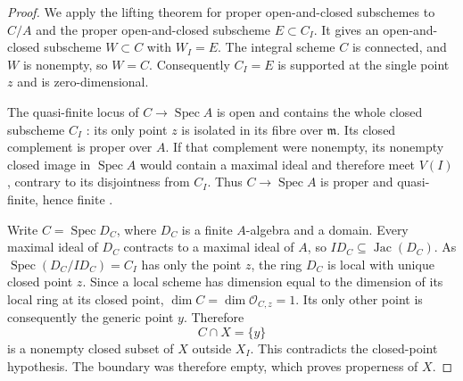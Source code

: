 \begin{proof}
We apply the lifting theorem for proper open-and-closed subschemes
\cite[Lemma~37.53.9, Tag~0CT9]{BStacks} to $C/A$ and the proper
open-and-closed subscheme $E\subset C_I$. It gives an
open-and-closed subscheme $W\subset C$ with $W_I=E$.
The integral scheme $C$ is connected, and $W$ is nonempty,
so $W=C$. Consequently $C_I=E$ is supported at the single
point $z$ and is zero-dimensional.

The quasi-finite locus of $C\to\operatorname{Spec}A$ is open
\cite[Lemma~29.57.2, Tag~01TI]{BStacks} and contains the whole closed
subscheme $C_I$ \cite[Lemma~29.30.5, Tag~0397]{BStacks}: its only
point $z$ is isolated in its fibre over $\mathfrak m$.
Its closed complement is proper over $A$. If that complement
were nonempty, its nonempty closed image in
$\operatorname{Spec}A$ would contain a maximal ideal and
therefore meet $V(I)$, contrary to its disjointness from $C_I$.
Thus $C\to\operatorname{Spec}A$ is proper and quasi-finite,
hence finite \cite[Lemma~37.44.1, Tag~02LS]{BStacks}.

Write $C=\operatorname{Spec}D_C$, where $D_C$ is a finite
$A$-algebra and a domain. Every maximal ideal of $D_C$ contracts
to a maximal ideal of $A$, so $ID_C\subseteq\operatorname{Jac}(D_C)$.
As $\operatorname{Spec}(D_C/ID_C)=C_I$ has only the point $z$,
the ring $D_C$ is local with unique closed point $z$. Since a local
scheme has dimension equal to the dimension of its local ring
at its closed point, $\dim C=\dim\mathcal O_{C,z}=1$.
Its only other point is consequently the generic point $y$.
Therefore
\[
 C\cap X=\{y\}
\]
is a nonempty closed subset of $X$ outside $X_I$. This contradicts
the closed-point hypothesis. The boundary was therefore empty,
which proves properness of $X$.
\end{proof}


